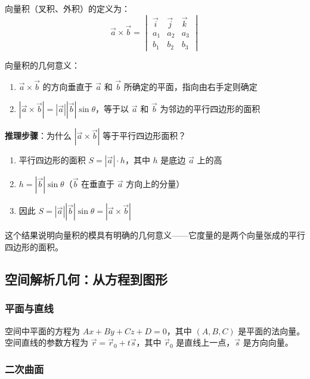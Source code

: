 向量积（叉积、外积）的定义为：
\[
\vec{a} \times \vec{b} = \begin{vmatrix} \vec{i} & \vec{j} & \vec{k} \\ a_1 & a_2 & a_3 \\ b_1 & b_2 & b_3 \end{vmatrix}
\]

向量积的几何意义：
\begin{enumerate}[leftmargin=2em]
    \item $\vec{a}\times\vec{b}$ 的方向垂直于 $\vec{a}$ 和 $\vec{b}$ 所确定的平面，指向由右手定则确定
    \item $|\vec{a}\times\vec{b}| = |\vec{a}||\vec{b}|\sin\theta$，等于以 $\vec{a}$ 和 $\vec{b}$ 为邻边的平行四边形的面积
\end{enumerate}

\begin{insightbox}
\textbf{推理步骤}：为什么 $|\vec{a}\times\vec{b}|$ 等于平行四边形面积？
\begin{enumerate}[leftmargin=2em]
    \item 平行四边形的面积 $S = |\vec{a}| \cdot h$，其中 $h$ 是底边 $\vec{a}$ 上的高
    \item $h = |\vec{b}|\sin\theta$（$\vec{b}$ 在垂直于 $\vec{a}$ 方向上的分量）
    \item 因此 $S = |\vec{a}||\vec{b}|\sin\theta = |\vec{a}\times\vec{b}|$
\end{enumerate}
这个结果说明向量积的模具有明确的几何意义——它度量的是两个向量张成的平行四边形的面积。
\end{insightbox}

\subsection{空间解析几何：从方程到图形}

\subsubsection{平面与直线}

空间中平面的方程为 $Ax+By+Cz+D=0$，其中 $(A,B,C)$ 是平面的法向量。空间直线的参数方程为 $\vec{r} = \vec{r}_0 + t\vec{s}$，其中 $\vec{r}_0$ 是直线上一点，$\vec{s}$ 是方向向量。

\subsubsection{二次曲面}

